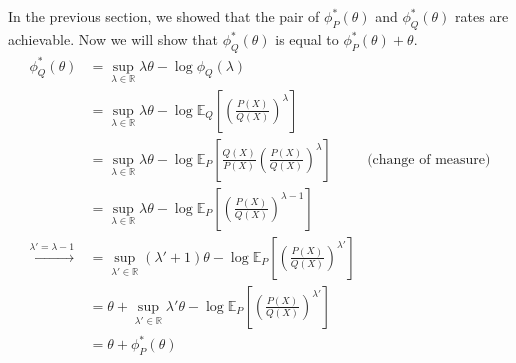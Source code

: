 \documentclass{article}
\numberwithin{equation}{section}
\newcommand{\EX}[2][]{\mathbb{E}_{#1}\left[#2\right]}%
\begin{document}
\subsection{}
In the previous section, we showed that the pair of \( \phi_P^*(\theta)\) and \( \phi_Q^*(\theta)\) rates are achievable.
Now we will show that \(\phi_Q^*(\theta)\) is equal to \(\phi_P^*(\theta) + \theta\).
\begin{align}
\phi_Q^*(\theta) &= \sup_{\lambda \in \mathbb{R}}\lambda \theta - \log \phi_Q(\lambda)\\
&= \sup_{\lambda \in \mathbb{R}}\lambda \theta - \log \EX[Q]{\left(\frac{P(X)}{Q(X)}\right)^\lambda}\\
&= \sup_{\lambda \in \mathbb{R}}\lambda \theta - \log \EX[P]{\frac{Q(X)}{P(X)}\left(\frac{P(X)}{Q(X)}\right)^\lambda} & \text{(change of measure)}\\
&= \sup_{\lambda \in \mathbb{R}}\lambda \theta - \log \EX[P]{\left(\frac{P(X)}{Q(X)}\right)^{\lambda - 1}}\\
\xrightarrow[]{\lambda' = \lambda - 1}&= \sup_{\lambda' \in \mathbb{R}} (\lambda' + 1) \theta - \log \EX[P]{\left(\frac{P(X)}{Q(X)}\right)^{\lambda'}}\\
&= \theta + \sup_{\lambda' \in \mathbb{R}} \lambda' \theta - \log \EX[P]{\left(\frac{P(X)}{Q(X)}\right)^{\lambda'}}\\
&= \theta + \phi_P^*(\theta)
\end{align}

\subsection{}
\subsection{}
\end{document}
